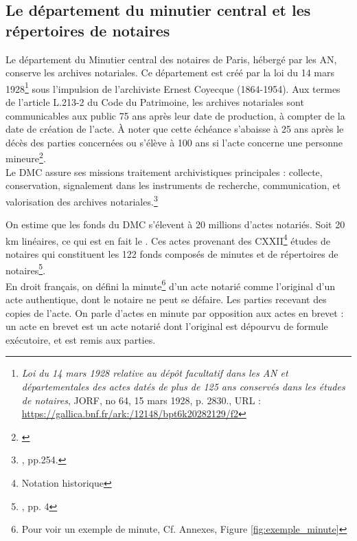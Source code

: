 \subsection{Le département du minutier central et les répertoires de notaires}

Le département du Minutier central des notaires de Paris, hébergé par les AN, conserve les archives notariales. Ce département est créé par la loi du 14 mars 1928\footnote{\textit{Loi du 14 mars 1928 relative au dépôt facultatif dans les AN et départementales des actes datés de plus de 125 ans conservés dans les études de notaires}, JORF, no 64, 15 mars 1928, p. 2830., URL : \url{https://gallica.bnf.fr/ark:/12148/bpt6k20282129/f2}} sous l'impulsion de l'archiviste Ernest Coyecque (1864-1954). Aux termes de l'article L.213-2 du Code du Patrimoine, les archives notariales sont communicables aux public 75 ans après leur date de production, à compter de la date de création de l'acte. À noter que cette échéance s'abaisse à 25 ans après le décès des parties concernées ou s'élève à 100 ans si l'acte concerne une personne mineure\footnote{\cite{limon-bonnet_les_2013}}.\\

Le DMC assure ses missions traitement archivistiques principales : collecte, conservation, signalement dans les instruments de recherche, communication, et valorisation des archives notariales.\footnote{\cite{limon-bonnet_innovation_2019}, pp.254.}

On estime que les fonds du DMC s'élevent à 20 millions d'actes notariés. Soit 20 km linéaires, ce qui est en fait le . Ces actes provenant des CXXII\footnote{Notation historique} études de notaires qui constituent les 122 fonds composés de minutes et de répertoires de notaires\footnote{\cite{limon-bonnet_122_2012}, pp. 4}.\\

En droit français, on défini la minute\footnote{Pour voir un exemple de minute, Cf. Annexes, Figure \ref{fig:exemple_minute}} d'un acte notarié comme l'original d'un acte authentique, dont le notaire ne peut se défaire. Les parties recevant des copies de l'acte. On parle d'actes en minute par opposition aux actes en brevet : un acte en brevet est un acte notarié dont l'original est dépourvu de formule exécutoire, et est remis aux parties.\\

